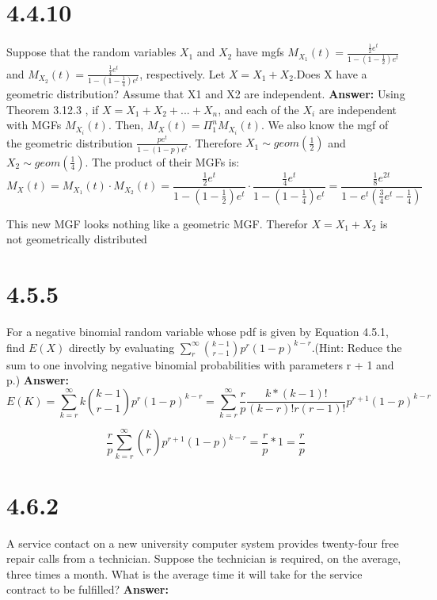 \documentclass[svgnames]{article}
\begin{document}
\section{4.4.10}
Suppose that the random variables $X_1$ and $X_2$ have mgfs $M_{X_1}(t) =\frac{\frac{1}{2} e^t}{1-(1-\frac{1}{2})e^t}$ and $M_{X_2}(t) = \frac{\frac{1}{4}e^t}{1-(1-\frac{1}{4})e^t}$, respectively. Let $X = X_1 +X_2$.Does X have a geometric distribution? Assume that X1 and X2 are independent.
\newline
\newline
\textbf{Answer:}
Using Theorem 3.12.3 , if $X=X_1+X_2+...+X_n$, and each of the $X_i$ are independent with MGFs $M_{X_{i}}(t)$. Then, $M_{X}(t)=\Pi_{1}^{n}M_{X_i}(t)$.
\newline
\newline
We also know the mgf of the geometric distribution $\frac{pe^t}{1-(1-p)e^t} $. Therefore $X_1\sim geom(\frac{1}{2})$ and $X_2\sim geom(\frac{1}{4})$.
\newline
\newline
The product of their MGFs is:
$$ M_{X}(t)=M_{X_1}(t)\cdot M_{X_2}(t)=\frac{\frac{1}{2} e^t}{1-(1-\frac{1}{2})e^t}\cdot \frac{\frac{1}{4}e^t}{1-(1-\frac{1}{4})e^t}= \frac{\frac{1}{8}e^{2t}}{1-e^t(\frac{3}{4}e^t-\frac{1}{4})}$$

This new MGF looks nothing like a geometric MGF. Therefor $X=X_1+X_2$ is not geometrically distributed

\section{4.5.5}
 For a negative binomial random variable whose pdf is given by Equation 4.5.1, find $E(X)$ directly by evaluating $\sum^{\infty}_{r}\binom{k-1}{r-1}p^{r}(1-p)^{k-r}$.(Hint: Reduce the sum to one
involving negative binomial probabilities with parameters r + 1 and p.)
\newline
\newline
\textbf{Answer:}
$$E(K)=\sum^{\infty}_{k=r}k\binom{k-1}{r-1}p^{r}(1-p)^{k-r}=\sum^{\infty}_{k=r}\frac{r}{p}\frac{k*(k-1)!}{(k-r)!r(r-1)!}p^{r+1}(1-p)^{k-r}$$

$$\frac{r}{p}\sum^{\infty}_{k=r}\binom{k}{r}p^{r+1}(1-p)^{k-r}=\frac{r}{p}*1=\frac{r}{p}$$

\section{4.6.2}
A service contact on a new university computer system provides twenty-four free repair calls from a technician. Suppose the technician is required, on the average, three times a month. What is the average time it will take for the service contract to be fulfilled?
\newline
\newline
\textbf{Answer:}
\end{document}
